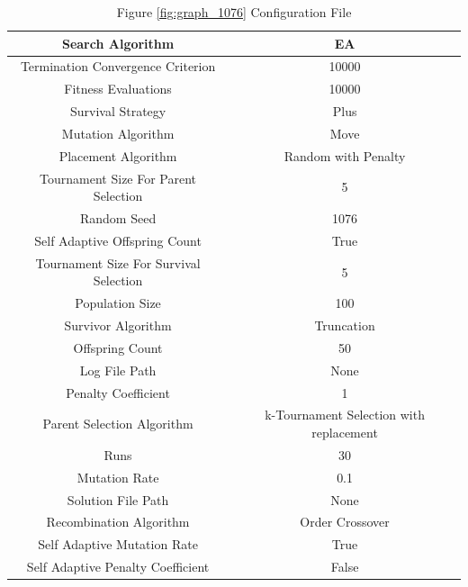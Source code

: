 \documentclass{standalone}
\begin{document}
\begin{table}[!htb]
	\centering
	\caption{Figure \ref{fig:graph_1076} Configuration File}
	\label{tab:graph_1076}
	\begin{tabular}{| c | c |}
		\hline
		Search Algorithm		& EA		 \\
		\hline
		Termination Convergence Criterion		& 10000		 \\
		\hline
		Fitness Evaluations		& 10000		 \\
		\hline
		Survival Strategy		& Plus		 \\
		\hline
		Mutation Algorithm		& Move		 \\
		\hline
		Placement Algorithm		& Random with Penalty		 \\
		\hline
		Tournament Size For Parent Selection		& 5		 \\
		\hline
		Random Seed		& 1076		 \\
		\hline
		Self Adaptive Offspring Count		& True		 \\
		\hline
		Tournament Size For Survival Selection		& 5		 \\
		\hline
		Population Size		& 100		 \\
		\hline
		Survivor Algorithm		& Truncation		 \\
		\hline
		Offspring Count		& 50		 \\
		\hline
		Log File Path		& None		 \\
		\hline
		Penalty Coefficient		& 1		 \\
		\hline
		Parent Selection Algorithm		& k-Tournament Selection with replacement		 \\
		\hline
		Runs		& 30		 \\
		\hline
		Mutation Rate		& 0.1		 \\
		\hline
		Solution File Path		& None		 \\
		\hline
		Recombination Algorithm		& Order Crossover		 \\
		\hline
		Self Adaptive Mutation Rate		& True		 \\
		\hline
		Self Adaptive Penalty Coefficient		& False		 \\
		\hline
	\end{tabular}
\end{table}
\end{document}
